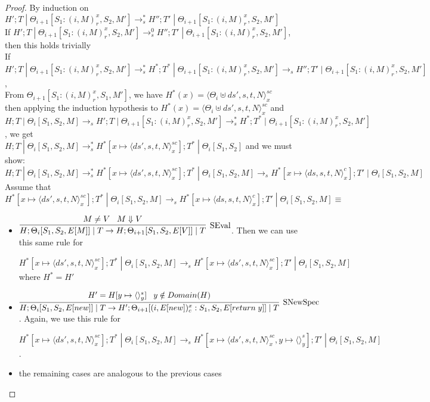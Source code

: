 \documentclass[9pt]{article}
\newcommand\specStep{\rightarrow_{s}}
\newcommand{\eval}[1]{E[#1]}
\begin{document}
\begin{proof}
By induction on $H'; T \; | \; \Theta_{i+1}[S_1 : (i, M)_r^x, S_2, M'] \specStep^* H''; T' \; | \; \Theta_{i+1}[S_1 : (i, M)_r^x, S_2, M']$ \\
If $H'; T \; | \; \Theta_{i+1}[S_1 : (i, M)_r^x, S_2, M'] \specStep^0 H''; T'\; | \; \Theta_{i+1}[S_1 : (i, M)_r^x, S_2, M']$, then this holds trivially \\
If $H'; T \; | \; \Theta_{i+1}[S_1 : (i, M)_r^x, S_2, M'] \specStep^* H^*; T^* \; | \; \Theta_{i+1}[S_1 : (i, M)_r^x, S_2, M'] \specStep H''; T' \; | \; \Theta_{i+1}[S_1 : (i, M)_r^x, S_2, M']$, \\
From $\Theta_{i+1}[S_1 : (i, M)_r^x, S_1, M']$, we have $H^*(x) = \langle \Theta_i \uplus ds', s, t, N\rangle_x^{sc}$ \\
then applying the induction hypothesis to $H^*(x) = \langle \Theta_i \uplus ds', s, t, N\rangle_x^{sc}$ and \\
$H; T \; | \; \Theta_i[S_1, S_2, M] \specStep H'; T \; | \; \Theta_{i+1}[S_1 : (i, M)_r^x, S_2, M'] \specStep^* H^*; T^* \; | \; \Theta_{i+1}[S_1 : (i, M)_r^x, S_2, M']$, we get \\
$H; T \; | \; \Theta_i[S_1, S_2, M] \specStep^* H^*[x \mapsto \langle ds', s, t, N\rangle_x^{sc}]; T^* \; | \; \Theta_i[S_1, S_2]$ and we must show: \\
$H; T \; | \; \Theta_i[S_1, S_2, M] \specStep^* H^*[x \mapsto \langle ds', s, t, N\rangle_x^{sc}]; T^* \; | \; \Theta_i[S_1, S_2, M] \specStep H^*[x \mapsto \langle ds, s, t, N\rangle_x^c]; T' \; | \; \Theta_i[S_1, S_2, M]$ \\
Assume that $H^*[x \mapsto \langle ds', s, t, N\rangle_x^{sc}]; T^* \; | \; \Theta_i[S_1, S_2, M] \specStep H^*[x \mapsto \langle ds, s, t, N\rangle_x^c]; T' \; | \; \Theta_i[S_1, S_2, M] \equiv $

\begin{itemize}
\item $\infer[\text{SEval}]{H; \Theta_i[S_1, S_2, \eval{M}] \; | \; T  \rightarrow H; \Theta_{i+1}[S_1, S_2, \eval{V}] \; | \; T}{M \neq V \;\;\; M \Downarrow V} $.  Then we can use this same rule for 

$H^*[x \mapsto \langle ds', s, t, N\rangle_x^{sc}]; T^* \; | \; \Theta_i[S_1, S_2, M] \specStep H^*[x \mapsto \langle ds', s, t, N\rangle_x^{sc}]; T' \; | \; \Theta_i[S_1, S_2, M]$ where $H^* = H'$

\item $\infer[\text{SNewSpec}]{H; \Theta_i[S_1, S_2, \eval{new}] \; | \; T \rightarrow H';  \Theta_{i+1}[(i, \eval{new})_c^x : S_1, S_2, \eval{return \; y}] \; | \; T}{H' = H[y \mapsto \langle\rangle_y^s] \;\;\; y \notin Domain(H)}$.  Again, we use this rule for 

$H^*[x \mapsto \langle ds', s, t, N\rangle_x^{sc}]; T^* \; | \; \Theta_i[S_1, S_2, M] \specStep H^*[x \mapsto \langle ds', s, t, N\rangle_x^{sc}, y\mapsto \langle\rangle_y^s]; T' \; | \; \Theta_i[S_1, S_2, M]$.

\item the remaining cases are analogous to the previous cases
\end{itemize}
 
\end{proof}
\end{document}
